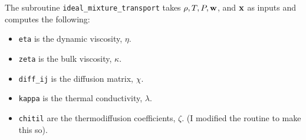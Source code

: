\documentclass[final]{siamltex}
\def\wb {{\bf w}}
\def\xb {{\bf x}}
\begin{document}
The subroutine {\tt ideal\_mixture\_transport} takes $\rho,T,P,\wb$, and $\xb$ 
as inputs and computes the following:\\
\begin{itemize}

\item {\tt eta} is the dynamic viscosity, $\eta$.\\

\item {\tt zeta} is the bulk viscosity, $\kappa$.\\

\item {\tt diff\_ij} is the diffusion matrix, $\chi$.\\

\item {\tt kappa} is the thermal conductivity, $\lambda$.\\

\item {\tt chitil} are the thermodiffusion coefficients, $\zeta$.
                   (I modified the routine to make this so).\\

\end{itemize}



\end{document}
